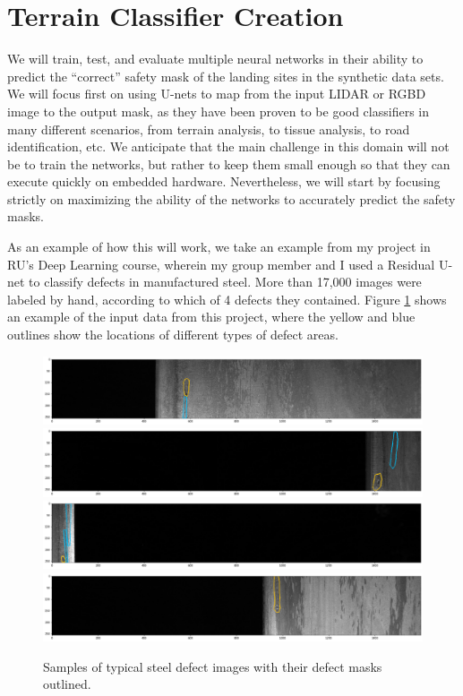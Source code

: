\section{Terrain Classifier Creation}

We will train, test, and evaluate multiple neural networks in their ability to predict the
``correct'' safety mask of the landing sites in the synthetic data sets.
We will focus first on using U-nets to map from the input LIDAR or RGBD image
to the output mask, as they have been proven to be good classifiers in many different scenarios,
from terrain analysis, to tissue analysis, to road identification, etc.
We anticipate that the main challenge in this domain will not be
to train the networks, but rather to keep them small enough
so that they can execute quickly on embedded hardware.
Nevertheless, we will start by focusing strictly on maximizing the ability of the networks
to accurately predict the safety masks.

As an example of how this will work, we take an example from my project in RU's Deep Learning
course, wherein my group member and I used a Residual U-net to classify defects
in manufactured steel.
More than 17,000 images were labeled by hand, according to which of 4 defects they contained.
Figure \ref{figure:steel_defect_images} shows an example of the input data from this project,
where the yellow and blue outlines show the locations of different types of defect areas.

\begin{figure}
    \centering
    \includegraphics[width=\textwidth]{images/masked_image_1.png}
    \includegraphics[width=\textwidth]{images/masked_image_2.png}
    \includegraphics[width=\textwidth]{images/masked_image_3.png}
    \includegraphics[width=\textwidth]{images/masked_image_4.png}
    \caption{Samples of typical steel defect images with their defect masks outlined.}
    \label{figure:steel_defect_images}
\end{figure}


